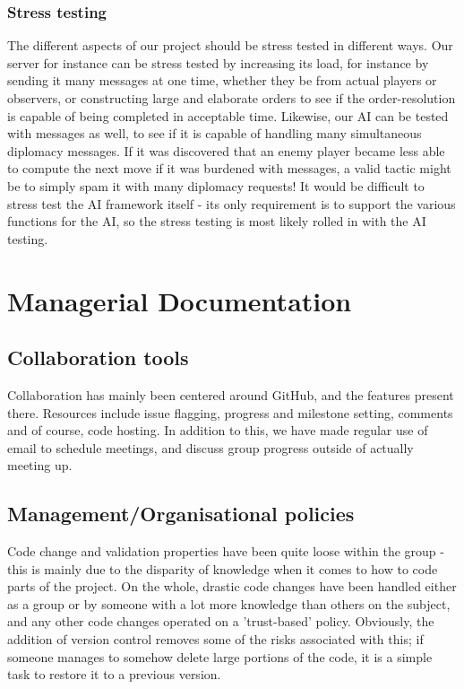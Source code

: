 \documentclass[11pt]{article}
\begin{document}
\subsubsection{Stress testing}
The different aspects of our project should be stress tested in different ways.
Our server for instance can be stress tested by increasing its load, for 
instance by sending it many messages at one time, whether they be from actual
players or observers, or constructing large and elaborate orders to see if the
order-resolution is capable of being completed in acceptable time. Likewise, our
AI can be tested with messages as well, to see if it is capable of handling many
simultaneous diplomacy messages. If it was discovered that an enemy player 
became less able to compute the next move if it was burdened with messages, a 
valid tactic might be to simply spam it with many diplomacy requests! It would
be difficult to stress test the AI framework itself - its only requirement is to
support the various functions for the AI, so the stress testing is most likely
rolled in with the AI testing. 

\section{Managerial Documentation}

\subsection{Collaboration tools}
Collaboration has mainly been centered around GitHub, and the features present
there. Resources include issue flagging, progress and milestone setting, comments 
and of course, code hosting. In addition to this, we have made regular use of 
email to schedule meetings, and discuss group progress outside of actually 
meeting up.

\subsection{Management/Organisational policies}
Code change and validation properties have been quite loose within the group - 
this is mainly due to the disparity of knowledge when it comes to how to code 
parts of the project. On the whole, drastic code changes have been handled 
either as a group or by someone with a lot more knowledge than others on the 
subject, and any other code changes operated on a 'trust-based' policy. 
Obviously, the addition of version control removes some of the risks associated
with this; if someone manages to somehow delete large portions of the code, it
is a simple task to restore it to a previous version.
\end{document}

